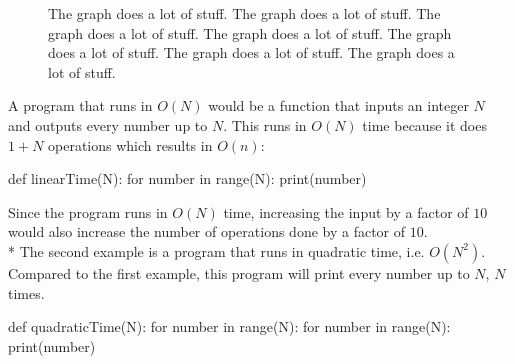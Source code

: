 \documentclass[main.tex]{subfiles}
\begin{document}
\begin{figure}[ht]
  \begin{center}
  \end{center}
  \caption{The graph does a lot of stuff. The graph does a lot of stuff. The
    graph does a lot of stuff. The graph does a lot of stuff. The graph does a
    lot of stuff. The graph does a lot of stuff. The graph does a lot of stuff.}
\end{figure}

\vspace{10mm}

A program that runs in $O(N)$ would be a function that inputs an integer $N$ and
outputs every number up to $N$. This runs in $O(N)$ time because it does $1+N$
operations which results in $O(n)$:
\begin{python}
  def linearTime(N): for number in range(N): print(number)
\end{python}

Since the program runs in $O(N)$ time, increasing the input by a factor of $10$
would also increase the number of operations done by a factor of $10$. \newline
\\*
The second example is a program that runs in quadratic time, i.e. $O(N^{2})$.
Compared to the first example, this program will print every number up to $N$,
$N$ times.

\begin{python}
  def quadraticTime(N): for number in range(N): for number in range(N):
  print(number)
\end{python}

\vspace{10mm}
\end{document}
